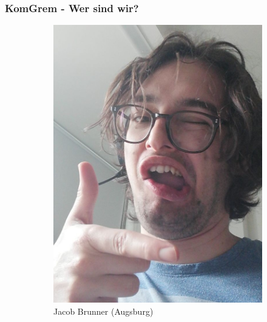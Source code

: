 \documentclass[compress, aspectratio=169]{beamer}
\begin{document}
\begin{frame}\frametitle{KomGrem - Wer sind wir?}
 \begin{figure}
		\begin{subfigure}[t]{0.24\textwidth}
			\includegraphics[width = \textwidth]{brunner.jpg}
			\caption*{Jacob Brunner (Augsburg)}
		\end{subfigure}
			\begin{subfigure}[t]{0.24\textwidth}

\end{subfigure}
\end{figure}
\end{frame}
\end{document}
